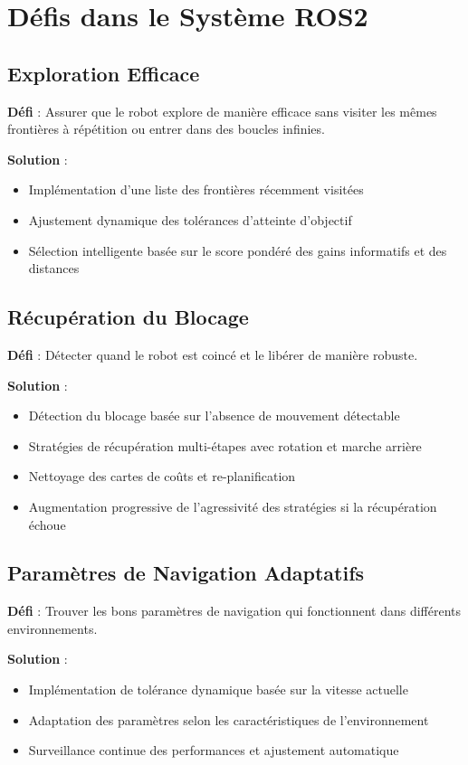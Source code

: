 \documentclass[12pt,a4paper,oneside]{report}
\begin{document}
\section{Défis dans le Système ROS2}

\subsection{Exploration Efficace}

\textbf{Défi} : Assurer que le robot explore de manière efficace sans visiter les mêmes frontières à répétition ou entrer dans des boucles infinies.

\textbf{Solution} : 
\begin{itemize}
  \item Implémentation d'une liste des frontières récemment visitées
  \item Ajustement dynamique des tolérances d'atteinte d'objectif
  \item Sélection intelligente basée sur le score pondéré des gains informatifs et des distances
\end{itemize}

\subsection{Récupération du Blocage}

\textbf{Défi} : Détecter quand le robot est coincé et le libérer de manière robuste.

\textbf{Solution} :
\begin{itemize}
  \item Détection du blocage basée sur l'absence de mouvement détectable
  \item Stratégies de récupération multi-étapes avec rotation et marche arrière
  \item Nettoyage des cartes de coûts et re-planification
  \item Augmentation progressive de l'agressivité des stratégies si la récupération échoue
\end{itemize}

\subsection{Paramètres de Navigation Adaptatifs}

\textbf{Défi} : Trouver les bons paramètres de navigation qui fonctionnent dans différents environnements.

\textbf{Solution} :
\begin{itemize}
  \item Implémentation de tolérance dynamique basée sur la vitesse actuelle
  \item Adaptation des paramètres selon les caractéristiques de l'environnement
  \item Surveillance continue des performances et ajustement automatique
\end{itemize}
\end{document}
